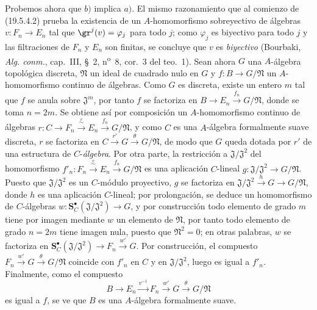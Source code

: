 \begin{env}[19.5.4.3]
\label{0.19.5.4.3-fr}

Probemos ahora que $b)$ implica $a)$. El mismo razonamiento que al comienzo de
(19.5.4.2) prueba la existencia de un $A$-homomorfismo sobreyectivo de álgebras
$v:F_n\to E_n$ tal que $\gr^j(v)=\varphi_j$ para todo $j$; como $\varphi_j$
es biyectivo para todo $j$ y las filtraciones de $F_n$ y $E_n$ son
finitas, se concluye que $v$ es \emph{biyectivo} (Bourbaki,
\emph{Alg. conm.}, cap.~III, §~2, n\textsuperscript{o}~8, cor.~3 del teo.~1).
Sean ahora $G$ una $A$-álgebra topológica discreta, $\mathfrak N$ un
ideal de cuadrado nulo en $G$ y $f:B\to G/\mathfrak N$ un $A$-homomorfismo
continuo de álgebras. Como $G$ es discreta, existe un entero $m$ tal que
$f$ se anula sobre $\mathfrak J^m$, por tanto $f$ se factoriza en
$B\to E_n\xrightarrow{f_n}G/\mathfrak N$, donde se toma $n=2m$. Se obtiene así por
composición un $A$-homomorfismo continuo de álgebras
$r:C\to F_n\xrightarrow{\overset{v}{\sim}}E_n\xrightarrow{f_n}G/\mathfrak N$, y como $C$
es una $A$-álgebra formalmente suave discreta, $r$ se factoriza en
$C\xrightarrow{r'}G\xrightarrow{\theta}G/\mathfrak N$, de modo que $G$ queda dotada por $r'$ de una
estructura de $C$-\emph{álgebra}. Por otra parte, la restricción a
$\mathfrak J/\mathfrak J^2$ del homomorfismo
$f'_n:F_n\xrightarrow{\overset{v}{\sim}}E_n\xrightarrow{f_n}G/\mathfrak N$ es una aplicación
$C$-lineal $g:\mathfrak J/\mathfrak J^2\to G/\mathfrak N$. Puesto que
$\mathfrak J/\mathfrak J^2$ es un $C$-módulo proyectivo, $g$ se factoriza en
$\mathfrak J/\mathfrak J^2\xrightarrow{h}G\to G/\mathfrak N$, donde $h$ es una
aplicación $C$-lineal; por prolongación, se deduce un homomorfismo de
$C$-álgebras $w:\mathbf S_C^\bullet(\mathfrak J/\mathfrak J^2)\to G$, y por
construcción todo elemento de grado $m$ tiene por imagen mediante $w$ un elemento de
$\mathfrak N$, por tanto todo elemento de grado $n=2m$ tiene imagen nula, puesto que
$\mathfrak N^2=0$; en otras palabras, $w$ se factoriza en
$\mathbf S_C^\bullet(\mathfrak J/\mathfrak J^2)\to F_n\xrightarrow{w'}G$. Por
construcción, el compuesto $F_n\xrightarrow{w'}G\xrightarrow{\theta}G/\mathfrak N$
coincide con $f'_n$ en $C$ y en $\mathfrak J/\mathfrak J^2$, luego es
igual a $f'_n$. Finalmente, como el compuesto
\[
  B\to E_n\xrightarrow{v^{-1}}F_n\xrightarrow{w'}G\xrightarrow{\theta}G/\mathfrak N
\] es
igual a $f$, se ve que $B$ es una $A$-álgebra formalmente suave.
\end{env}

